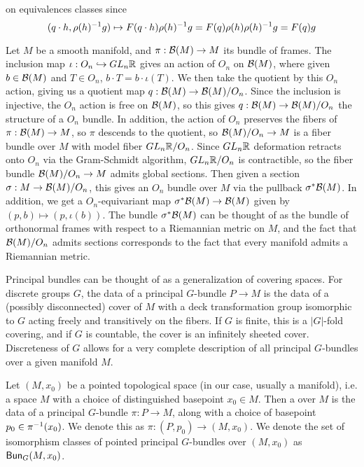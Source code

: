 on equivalences classes since
\[
(q \cdot h, \rho(h)^{-1} g) \mapsto F(q \cdot h)\rho(h)^{-1} g = F(q)\rho(h)\rho(h)^{-1} g
= F(q)g
\]
%
\begin{exmp}
Let $M$ be a smooth manifold, and $\pi : \mathcal{B}(M) \to M$ its bundle of frames.
The inclusion map $\iota: O_n \hookrightarrow GL_n\mathbb{R}$ gives an action of $O_n$ on
$\mathcal{B}(M)$, where given $b \in \mathcal{B}(M)$ and $T \in O_n$, $b \cdot T = b \cdot \iota(T)$.
We then take the quotient by this $O_n$ action, giving us a quotient map
$q : \mathcal{B}(M) \to \mathcal{B}(M) / O_n$. Since the inclusion is injective, the $O_n$ action
is free on $\mathcal{B}(M)$, so this gives $q : \mathcal{B}(M) \to \mathcal{B}(M) / O_n$ the structure of a
$O_n$ bundle. In addition, the action of $O_n$ preserves the fibers of
$\pi : \mathcal{B}(M) \to M$, so $\pi$ descends to the quotient, so $\mathcal{B}(M) / O_n \to M$
is a fiber bundle over $M$ with model fiber $GL_n\mathbb{R} / O_n$. Since $GL_n\mathbb{R}$ deformation
retracts onto $O_n$ via the Gram-Schmidt algorithm, $GL_n\mathbb{R} / O_n$ is
contractible, so the fiber bundle $\mathcal{B}(M)/ O_n \to M$ admits global sections.
Then given a section $\sigma : M \to \mathcal{B}(M) / O_n$, this gives an $O_n$ bundle
over $M$ via the pullback $\sigma^*\mathcal{B}(M)$. In addition, we get a $O_n$-equivariant
map $\sigma^*\mathcal{B}(M) \to \mathcal{B}(M)$ given by $(p, b) \mapsto (p, \iota(b))$. The
bundle $\sigma^*\mathcal{B}(M)$ can be thought of as the bundle of orthonormal frames
with respect to a Riemannian metric on $M$, and the fact that $\mathcal{B}(M) / O_n$
admits sections corresponds to the fact that every manifold admits a Riemannian
metric.
\end{exmp}
%
Principal bundles can be thought of as a generalization of covering spaces.
For discrete groups $G$, the data of a principal $G$-bundle $P \to M$ is the
data of a (possibly disconnected) cover of $M$ with a deck transformation
group isomorphic to $G$ acting freely and transitively on the fibers. If
$G$ is finite, this is a $|G|$-fold covering, and if $G$ is countable, the
cover is an infinitely sheeted cover. Discreteness of $G$ allows for a very
complete description of all principal $G$-bundles over a given manifold $M$.
%
\begin{defn}
Let $(M,x_0)$ be a pointed topological space (in our case, usually a manifold),
i.e. a space $M$ with a choice of distinguished basepoint $x_0 \in M$. Then
a  over $M$ is the data of a principal $G$-bundle
$\pi : P \to M$, along with a choice of basepoint $p_0 \in \pi^{-1}(x_0)$. We
denote this as $\pi : (P,p_0) \to (M, x_0)$. We denote the set of isomorphism
classes of pointed principal $G$-bundles over $(M,x_0)$ as $\mathsf{Bun}_G(M ,x_0)$.
\end{defn}
